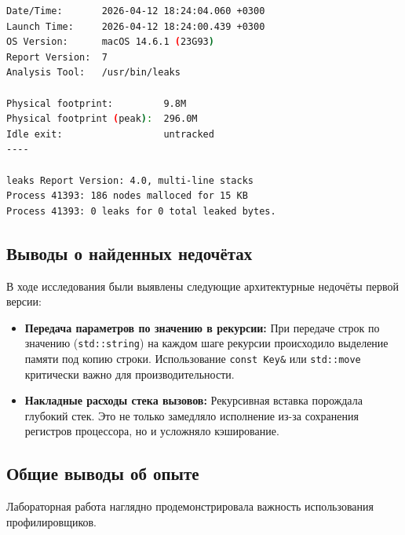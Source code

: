 \begin{enumerate}
\begin{lstlisting}[language=bash]
Date/Time:       2026-04-12 18:24:04.060 +0300
Launch Time:     2026-04-12 18:24:00.439 +0300
OS Version:      macOS 14.6.1 (23G93)
Report Version:  7
Analysis Tool:   /usr/bin/leaks

Physical footprint:         9.8M
Physical footprint (peak):  296.0M
Idle exit:                  untracked
----

leaks Report Version: 4.0, multi-line stacks
Process 41393: 186 nodes malloced for 15 KB
Process 41393: 0 leaks for 0 total leaked bytes.
\end{lstlisting}

\end{enumerate}

\subsection{Выводы о найденных недочётах}
В ходе исследования были выявлены следующие архитектурные недочёты первой версии:
\begin{itemize}
    \item \textbf{Передача параметров по значению в рекурсии:} При передаче строк по значению (\texttt{std::string}) на каждом шаге рекурсии происходило выделение памяти под копию строки. Использование \texttt{const Key\&} или \texttt{std::move} критически важно для производительности.
    \item \textbf{Накладные расходы стека вызовов:} Рекурсивная вставка порождала глубокий стек. Это не только замедляло исполнение из-за сохранения регистров процессора, но и усложняло кэширование.
\end{itemize}

\subsection{Общие выводы об опыте}
Лабораторная работа наглядно продемонстрировала важность использования профилировщиков.
\newpage